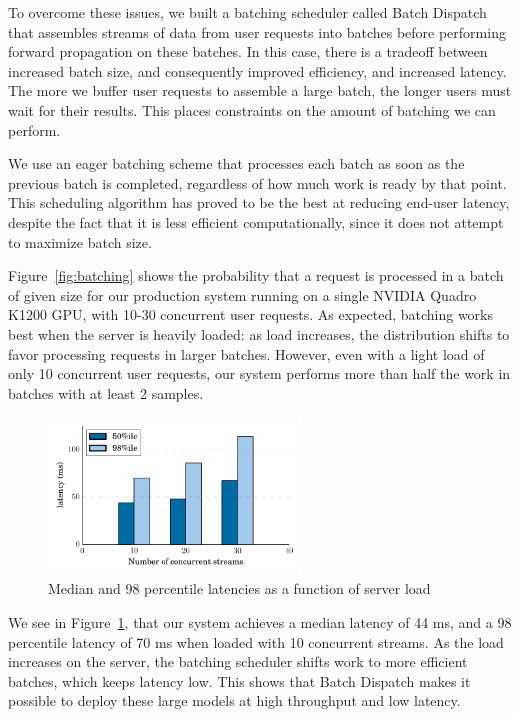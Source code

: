 \documentclass{article}
\begin{document}
To overcome these issues, we built a batching scheduler called Batch Dispatch that assembles streams of data from user requests into batches before performing forward propagation on these batches. In this case, there is a tradeoff between increased batch size, and consequently improved efficiency, and increased latency. The more we buffer user requests to assemble a large batch, the longer users must wait for their results. This places constraints on the amount of batching we can perform.

We use an eager batching scheme that processes each batch as soon as the previous batch is completed, regardless of how much work is ready by that point. This scheduling algorithm has proved to be the best at reducing end-user latency, despite the fact that it is less efficient computationally, since it does not attempt to maximize batch size.

Figure~\ref{fig:batching} shows the probability that a request is processed in a batch of given size for our production system running on a single NVIDIA Quadro K1200 GPU, with 10-30 concurrent user requests. As expected, batching works best when the server is heavily loaded: as load increases, the distribution shifts to favor processing requests in larger batches. However, even with a light load of only 10 concurrent user requests, our system performs more than half the work in batches with at least 2 samples.

\begin{figure}[h]
\centering
\includegraphics[width=0.6\textwidth]{latency.pdf}
\caption{Median and 98 percentile latencies as a function of server load}
\label{fig:latency}
\end{figure}

We see in Figure~\ref{fig:latency}, that our system achieves a median latency of 44 ms, and a 98 percentile latency of 70 ms when loaded with 10 concurrent streams. As the load increases on the server, the batching scheduler shifts work to more efficient batches, which keeps latency low. This shows that Batch Dispatch makes it possible to deploy these large models at high throughput and low latency.
\end{document}
